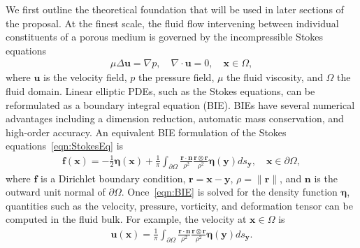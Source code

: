 \documentclass[11pt]{article}
\newcommand{\bvec}[1]{{\mathbf{#1}}}
\newcommand{\grad}{\nabla}
\newcommand{\uu}{\bvec{u}}
\newcommand{\xx}{\bvec{x}}
\newcommand{\nn}{{\mathbf{n}}}
\newcommand{\bd}{\partial}
\newcommand{\eeta}{\boldsymbol{\eta}}
\newcommand{\rr}{\mathbf{r}}
\newcommand{\ff}{\mathbf{f}}
\newcommand{\yy}{\mathbf{y}}
\begin{document}
We first outline the theoretical foundation that will be used in later sections of the proposal. At the finest scale, the fluid flow intervening between individual constituents of a porous medium is governed by the incompressible Stokes equations
\begin{align}
  \label{eqn:StokesEq}
  \mu \Delta \uu = \grad p, \quad
  \grad \cdot \uu = 0, \quad \xx \in \Omega,
\end{align}
where $\uu$ is the velocity field, $p$ the pressure field, $\mu$ the fluid viscosity, and $\Omega$ the fluid domain. Linear elliptic PDEs, such as the Stokes equations, can be reformulated as a boundary integral equation (BIE).  BIEs have several numerical advantages including a dimension reduction, automatic mass conservation, and high-order accuracy. An equivalent BIE formulation of the Stokes equations~\eqref{eqn:StokesEq} is
\begin{align}
  \label{eqn:BIE}
  \ff(\xx) = -\frac{1}{2}\eeta(\xx) + \frac{1}{\pi} \int_{\bd\Omega}
    \frac{\rr \cdot \nn}{\rho^2} \frac{\rr \otimes \rr}{\rho^2}
    \eeta(\yy) ds_\yy, \quad \xx \in \bd\Omega,
\end{align}
where $\ff$ is a Dirichlet boundary condition, $\rr = \xx - \yy$, $\rho = \|\rr\|$, and $\nn$ is the outward unit normal of $\bd\Omega$.  Once~\eqref{eqn:BIE} is solved for the density function $\eeta$, quantities such as the velocity, pressure, vorticity, and deformation tensor can be computed in the fluid bulk.  For example, the velocity at $\xx \in \Omega$ is 
\begin{align}
  \uu(\xx) = \frac{1}{\pi} \int_{\bd\Omega}
    \frac{\rr \cdot \nn}{\rho^2} \frac{\rr \otimes \rr}{\rho^2}
    \eeta(\yy) ds_\yy.
\end{align}
\end{document}
